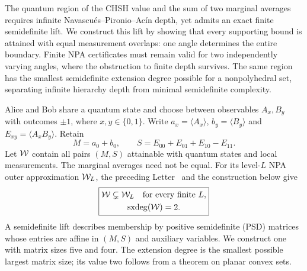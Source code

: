 \documentclass[11pt,twocolumn]{article}
\newcommand{\sxdeg}{\operatorname{sxdeg}}
\begin{document}

The quantum region of the CHSH value and the sum of two marginal averages requires infinite Navascués–Pironio–Acín depth, yet admits an exact finite semidefinite lift. We construct this lift by showing that every supporting bound is attained with equal measurement overlaps: one angle determines the entire boundary. Finite NPA certificates must remain valid for two independently varying angles, where the obstruction to finite depth survives. The same region has the smallest semidefinite extension degree possible for a nonpolyhedral set, separating infinite hierarchy depth from minimal semidefinite complexity.

Alice and Bob share a quantum state and choose between observables
$A_x,B_y$ with outcomes $\pm1$, where $x,y\in\{0,1\}$. Write $a_x=\langle A_x\rangle$, $b_y=\langle B_y\rangle$ and
$E_{xy}=\langle A_xB_y\rangle$. Retain
\begin{equation}
 M=a_0+b_0,\qquad S=E_{00}+E_{01}+E_{10}-E_{11}.
 \label{eq:coordinates}
\end{equation}
Let $\mathcal W$ contain all pairs $(M,S)$ attainable with quantum states
and local measurements. The marginal averages need not be equal.
For its level-$L$ NPA outer approximation $\mathcal W_L$, the preceding
Letter~\cite{prior} and the construction below give
\begin{equation}
 \boxed{\begin{gathered}
 \W\subsetneq\W_L\quad\text{for every finite }L,\\
 \sxdeg(\W)=2.
 \end{gathered}}
 \label{eq:result}
\end{equation}
A semidefinite lift describes membership by positive semidefinite (PSD)
matrices whose entries are affine in $(M,S)$ and auxiliary variables.
We construct one with matrix sizes five and four. The extension degree
is the smallest possible largest matrix size; its value two follows
from a theorem on planar convex sets.
\end{document}
